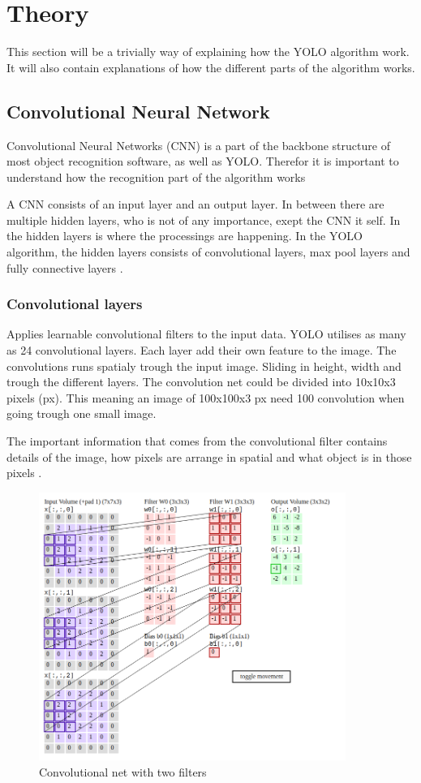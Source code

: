 \newpage

\section{Theory}

This section will be a trivially way of explaining how the YOLO algorithm work. It will also contain explanations of how the different parts of the algorithm works.

\subsection{Convolutional Neural Network}
Convolutional Neural Networks (CNN) is a part of the backbone structure of most object recognition software, as well as YOLO. Therefor it is important to understand how the recognition part of the algorithm works

A CNN consists of an input layer and an output layer. In between there are multiple hidden layers, who is not of any importance, exept the CNN it self. In the hidden layers is where the processings are happening. In the YOLO algorithm, the hidden layers consists of convolutional layers, max pool layers and fully connective layers \cite{YOLO}.


\subsubsection{Convolutional layers}
Applies learnable convolutional filters to the input data. YOLO utilises as many as 24 convolutional layers. Each layer add their own feature to the image. The convolutions runs spatialy trough the input image. Sliding in height, width and trough the different layers. The convolution net could be divided into 10x10x3 pixels (px). This meaning an image of 100x100x3 px need 100 convolution when going trough one small image. 

The important information that comes from the convolutional filter contains details of the image, how pixels are arrange in spatial and what object is in those pixels \cite{SF_ConvNet}.

\begin{figure}%
    \centering
        \includegraphics[width=10cm]{img/convNet.png} 
    \caption{Convolutional net with two filters \cite{SF_ConvNet} }
    \label{fig:SF_convNet}
\end{figure}

